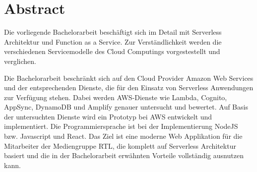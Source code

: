 
\section*{Abstract}

Die vorliegende Bachelorarbeit beschäftigt sich im Detail mit Serverless Architektur und Function as a Service.
Zur Verständlichkeit werden die verschiedenen Servicemodelle des Cloud Computings vorgestestellt und verglichen.

Die Bachelorarbeit beschränkt sich auf den Cloud Provider Amazon Web Services und der entsprechenden Dienste, die für den Einsatz von Serverless Anwendungen zur Verfügung stehen.
Dabei werden AWS-Dienste wie Lambda, Cognito, AppSync, DynamoDB und Amplify genauer untersucht und bewertet.
Auf Basis der untersuchten Dienste wird ein Prototyp bei AWS entwickelt und implementiert. Die Programmiersprache ist bei der Implementierung NodeJS bzw. Javascript und React.
Das Ziel ist eine moderne Web Applikation für die Mitarbeiter der Mediengruppe RTL, die komplett auf Serverless Architektur basiert
und die in der Bachelorarbeit erwähnten Vorteile vollständig ausnutzen kann.




\clearpage
